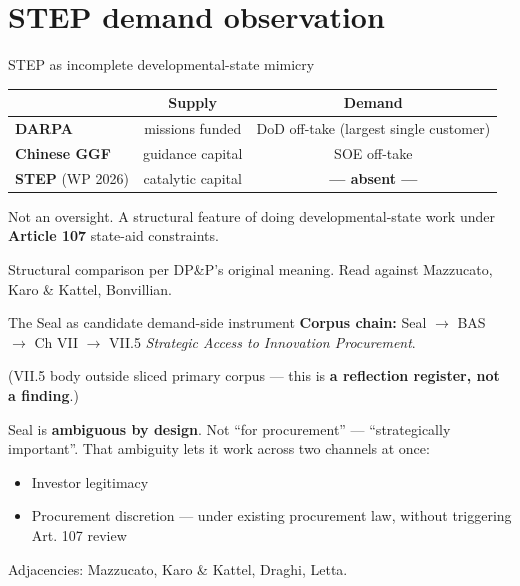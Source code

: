 \documentclass[aspectratio=169,hyperref={pdfpagelabels=false}]{beamer}
\begin{document}
\section{STEP demand observation}

\begin{frame}{STEP as incomplete developmental-state mimicry}
    \begin{center}
    \begin{tabular}{@{}lcc@{}}
        \toprule
                                    & \textbf{Supply}  & \textbf{Demand}                       \\ \midrule
        \textbf{DARPA}              & missions funded  & DoD off-take (largest single customer)\\
        \textbf{Chinese GGF}        & guidance capital & SOE off-take                          \\
        \textbf{STEP} (WP 2026)     & catalytic capital& \textbf{— absent —}                   \\ \bottomrule
    \end{tabular}
    \end{center}
    \vspace{3mm}
    Not an oversight. A structural feature of doing developmental-state work under \textbf{Article 107} state-aid constraints.

    \vspace{2mm}
    \footnotesize Structural comparison per DP\&P's original meaning. Read against Mazzucato, Karo \& Kattel, Bonvillian.
\end{frame}

\begin{frame}{The Seal as candidate demand-side instrument}
    \textbf{Corpus chain:} Seal $\to$ BAS $\to$ Ch VII $\to$ VII.5 \emph{Strategic Access to Innovation Procurement}.

    \vspace{2mm}
    \footnotesize (VII.5 body outside sliced primary corpus — this is \textbf{a reflection register, not a finding}.)

    \vspace{3mm}
    Seal is \textbf{ambiguous by design}. Not \enquote{for procurement} — \enquote{strategically important}. That ambiguity lets it work across two channels at once:
    \begin{itemize}
        \item Investor legitimacy
        \item Procurement discretion — under existing procurement law, without triggering Art. 107 review
    \end{itemize}

    \vspace{2mm}
    \footnotesize Adjacencies: Mazzucato, Karo \& Kattel, Draghi, Letta.
\end{frame}
\end{document}
